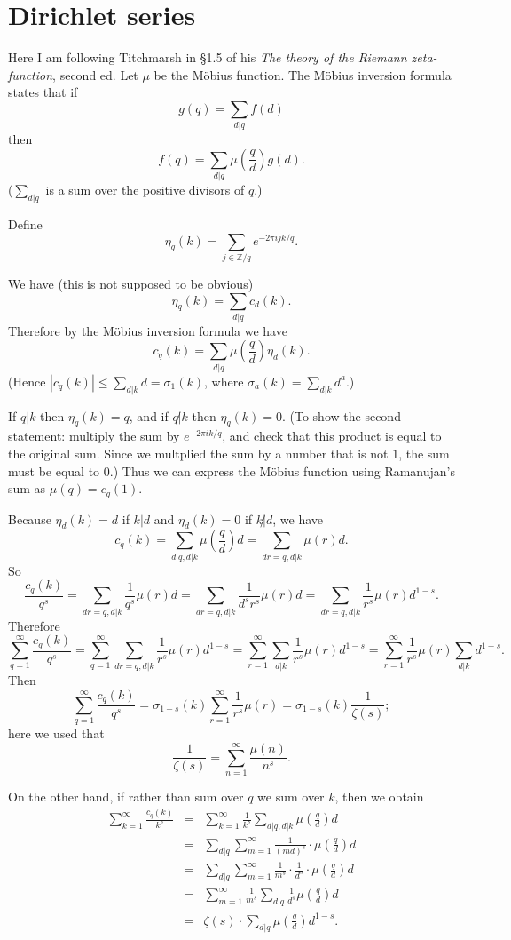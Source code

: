 \documentclass{article}
\begin{document}
\section{Dirichlet series}
Here I am following Titchmarsh in \S 1.5 of his {\em The theory of the Riemann zeta-function}, second ed.
Let $\mu$ be the M\"obius function.
The M\"obius inversion formula states that if
\[
g(q)=\sum_{d|q} f(d)
\]
then
\[
f(q)=\sum_{d|q} \mu\left(\frac{q}{d} \right) g(d).
\]
($\sum_{d|q}$ is a sum over the positive divisors of $q$.)

Define
\[
\eta_q(k)=\sum_{j \in \mathbb{Z}/q} e^{-2\pi ijk/q}.
\]


We have (this is not supposed to be obvious)
\[
\eta_q(k)=\sum_{d|q} c_d(k).
\]
Therefore by the M\"obius inversion formula we have
\[
c_q(k)=\sum_{d|q}  \mu\left(\frac{q}{d} \right) \eta_d(k).
\]
(Hence $|c_q(k)| \leq \sum_{d|k} d = \sigma_1(k)$, where $\sigma_a(k)=\sum_{d|k} d^a$.)

If $q|k$ then $\eta_q(k)=q$, and if $q \not | k$ then $\eta_q(k)=0$. (To show the second statement: multiply the sum by $e^{-2\pi i k/q}$, and check that this product is equal to the original sum.
Since we multplied the sum by a number that is not $1$, the sum must be equal to $0$.)
Thus we can express the M\"obius function using Ramanujan's sum as $\mu(q)=c_q(1)$. 

Because $\eta_d(k)=d$ if $k | d$ and $\eta_d(k)=0$ if $k \not | d$, we have
\[
c_q(k)=\sum_{d|q, d|k} \mu\left( \frac{q}{d} \right) d=\sum_{dr=q, d|k} \mu(r) d.
\] 
So
\[
\frac{c_q(k)}{q^s}=\sum_{dr=q, d|k} \frac{1}{q^s} \mu(r) d = \sum_{dr=q, d|k} \frac{1}{d^s r^s} \mu(r) d =  \sum_{dr=q, d|k} \frac{1}{r^s} \mu(r) d^{1-s}.
\]
Therefore
\[
\sum_{q=1}^\infty \frac{c_q(k)}{q^s} = \sum_{q=1}^\infty \sum_{dr=q, d|k} \frac{1}{r^s} \mu(r) d^{1-s} = \sum_{r=1}^\infty \sum_{d|k} \frac{1}{r^s} \mu(r) d^{1-s}
=\sum_{r=1}^\infty  \frac{1}{r^s} \mu(r) \sum_{d|k} d^{1-s}.
\]
Then
\[
\sum_{q=1}^\infty \frac{c_q(k)}{q^s} = \sigma_{1-s}(k) \sum_{r=1}^\infty  \frac{1}{r^s} \mu(r)= \sigma_{1-s}(k) \frac{1}{\zeta(s)};
\]
here we used that 
\[
\frac{1}{\zeta(s)}=\sum_{n=1}^\infty \frac{\mu(n)}{n^s}.
\]

On the other hand, if rather than sum over $q$ we sum over $k$, then we obtain
\begin{eqnarray*}
\sum_{k=1}^\infty \frac{c_q(k)}{k^s}&=&\sum_{k=1}^\infty \frac{1}{k^s}\sum_{d|q, d|k} \mu\left( \frac{q}{d} \right) d\\
&=&\sum_{d|q} \sum_{m=1}^\infty \frac{1}{(md)^s}  \cdot  \mu\left( \frac{q}{d} \right) d\\
&=&\sum_{d|q} \sum_{m=1}^\infty \frac{1}{m^s} \cdot \frac{1}{d^s}  \cdot \mu\left( \frac{q}{d} \right) d\\
&=&\sum_{m=1}^\infty \frac{1}{m^s} \sum_{d|q}\frac{1}{d^s}  \mu\left( \frac{q}{d} \right) d\\
&=&\zeta(s) \cdot \sum_{d|q}  \mu\left( \frac{q}{d} \right) d^{1-s}.
\end{eqnarray*}
\end{document}

